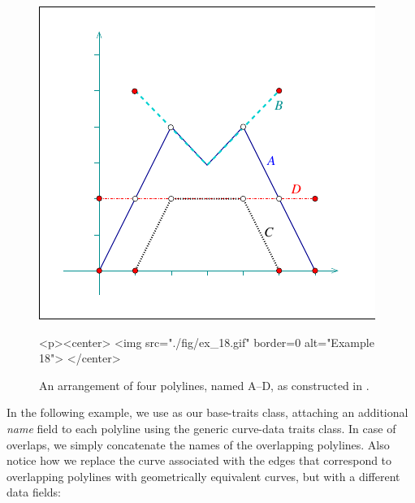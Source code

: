 
\begin{figure}[t]
\begin{ccTexOnly}
  \begin{center}
  \includegraphics{Arrangement_2/fig/ex_18}
  \end{center}
\end{ccTexOnly}
\begin{ccHtmlOnly}
  <p><center>
  <img src="./fig/ex_18.gif" border=0 alt="Example 18">
  </center>
\end{ccHtmlOnly}
\caption{An arrangement of four polylines, named A--D, as
constructed in .}
\label{arr_fig:ex_18}
\end{figure}

In the following example, we use  as
our base-traits class, attaching an additional {\em name} field to
each polyline using the generic curve-data traits class. In case of
overlaps, we simply concatenate the names of the overlapping
polylines. Also notice how we replace the curve associated with
the edges that correspond to overlapping polylines with 
geometrically equivalent curves, but with a different data fields:

